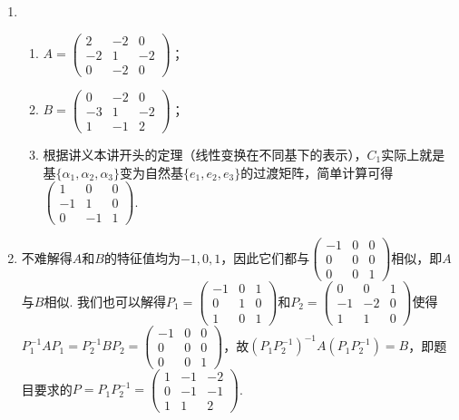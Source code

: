 \begin{enumerate}
    \item \begin{enumerate}
        \item $A=\begin{pmatrix}
            2 & -2 & 0 \\ -2 & 1 & -2 \\ 0 & -2 & 0
        \end{pmatrix}$；
        \item $B=\begin{pmatrix}
            0 & -2 & 0 \\ -3 & 1 & -2 \\ 1 & -1 & 2
        \end{pmatrix}$；
        \item 根据讲义本讲开头的定理（线性变换在不同基下的表示），$C_1$实际上就是基$\{\alpha_1,\alpha_2,\alpha_3\}$变为自然基$\{e_1,e_2,e_3\}$的过渡矩阵，简单计算可得$\begin{pmatrix}
            1 & 0 & 0 \\ -1 & 1 & 0 \\ 0 & -1 & 1
        \end{pmatrix}$.
    \end{enumerate}

    \item 不难解得$A$和$B$的特征值均为$-1,0,1$，因此它们都与$\begin{pmatrix}
        -1 & 0 & 0 \\ 0 & 0 & 0 \\ 0 & 0 & 1
    \end{pmatrix}$相似，即$A$与$B$相似. 我们也可以解得$P_1=\begin{pmatrix}
        -1 & 0 & 1 \\ 0 & 1 & 0 \\ 1 & 0 & 1
    \end{pmatrix}$和$P_2=\begin{pmatrix}
        0 & 0 & 1 \\ -1 & -2 & 0 \\ 1 & 1 & 0
    \end{pmatrix}$使得$P_1^{-1}AP_1=P_2^{-1}BP_2=\begin{pmatrix}
        -1 & 0 & 0 \\ 0 & 0 & 0 \\ 0 & 0 & 1
    \end{pmatrix}$，故$(P_1P_2^{-1})^{-1}A(P_1P_2^{-1})=B$，即题目要求的$P=P_1P_2^{-1}=\begin{pmatrix}
        1 & -1 & -2 \\ 0 & -1 & -1 \\ 1 & 1 & 2
    \end{pmatrix}$.


\end{enumerate}
